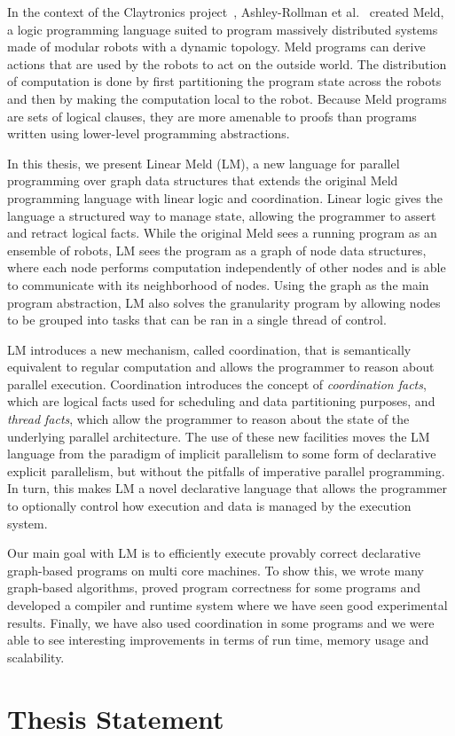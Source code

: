 In the context of the Claytronics project~\cite{goldstein-computer05},
Ashley-Rollman et al.~\cite{ashley-rollman-iclp09,
ashley-rollman-derosa-iros07wksp} created Meld, a logic programming language
suited to program massively distributed systems made of modular robots with a
dynamic topology. Meld programs can derive actions that are used by the
robots to act on the outside world. The distribution of computation is done by
first partitioning the program state across the robots and then by making the
computation local to the robot. Because Meld programs are sets of logical
clauses, they are more amenable to proofs than programs written using
lower-level programming abstractions.

In this thesis, we present Linear Meld (LM), a new language for parallel
programming over graph data structures that extends the original Meld
programming language with linear logic and coordination. Linear logic gives the
language a structured way to manage state, allowing the programmer to assert and
retract logical facts.  While the original Meld sees a running program as an
ensemble of robots, LM sees the program as a graph of node data structures,
where each node performs computation independently of other nodes and is able to
communicate with its neighborhood of nodes. Using the graph as the main program
abstraction, LM also solves the granularity program by allowing nodes to be
grouped into tasks that can be ran in a single thread of control.

LM introduces a new mechanism, called coordination, that is semantically
equivalent to regular computation and allows the programmer to reason about
parallel execution. Coordination introduces the concept of \emph{coordination
facts}, which are logical facts used for scheduling and data partitioning
purposes, and \emph{thread facts}, which allow the programmer to reason about
the state of the underlying parallel architecture. The use of these new
facilities moves the LM language from the paradigm of implicit parallelism to
some form of declarative explicit parallelism, but without the pitfalls of
imperative parallel programming. In turn, this makes LM a novel declarative
language that allows the programmer to optionally control how execution and data
is managed by the execution system.

Our main goal with LM is to efficiently execute provably correct declarative
graph-based programs on multi core machines. To show this, we wrote many
graph-based algorithms, proved program correctness for some programs and
developed a compiler and runtime system where we have seen good experimental
results. Finally, we have also used coordination in some programs and we were
able to see interesting improvements in terms of run time, memory usage and
scalability.

\section{Thesis Statement}



